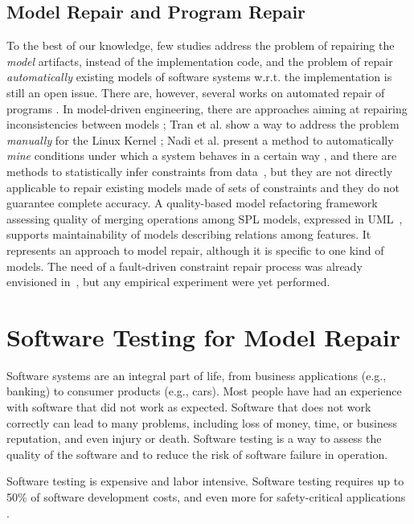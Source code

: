 \documentclass [a4paper, 12pt, twoside]{report}
\theoremstyle{plain}
\theoremstyle{definition}
\theoremstyle{remark}
\theoremstyle{plain}
\theoremstyle{plain}
\theoremstyle{remark}
\begin{document}
\subsection{Model Repair and Program Repair}
To the best of our knowledge, few studies address the problem of repairing the \textit{model} artifacts, instead of the implementation code, and the problem of repair \textit{automatically} existing models of software systems w.r.t. the implementation is still an open issue. 
There are, however, several works on automated repair of programs \cite{Nguyen_2013,le_goues_systematic_2012,ARCURI20113494}.
In model-driven engineering, there are approaches aiming at repairing inconsistencies between models \cite{Macedo_2013}; Tran et al. show a way to address the problem \textit{manually} for the Linux Kernel \cite{Tran:1999:FRR:781995.782007}; Nadi et al. present a method to automatically \textit{mine} conditions under which a system behaves in a certain way \cite{NadiBKC14}, and there are methods to statistically infer constraints from data~\cite{chiang_unified_2011,Abukwaik_2016}, but they are not directly applicable to repair existing models made of sets of constraints and they do not guarantee complete accuracy. 
A quality-based model refactoring framework assessing quality of merging operations among SPL models, expressed in UML~\cite{rubin_quality_2013}, supports maintainability of models describing relations among features. It represents an approach to model repair, although it is specific to one kind of models.
The need of a fault-driven constraint repair process was already envisioned in~\cite{henard_towards_2013}, but any empirical experiment were yet performed.


\section{Software Testing for Model Repair}\label{sec:testing}
Software systems are an integral part of life, from business applications (e.g., banking) to consumer
products (e.g., cars). Most people have had an experience with software that did not work as expected.
Software that does not work correctly can lead to many problems, including loss of money, time, or
business reputation, and even injury or death. Software testing is a way to assess the quality of the
software and to reduce the risk of software failure in operation.

Software testing is expensive and labor intensive. Software testing requires up to 50\% of software development costs, and even more for safety-critical applications \cite{testingbook}.
\end{document}
